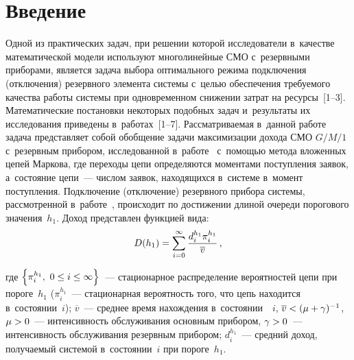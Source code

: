   



\thispagestyle{headings}

\begin{multicols}{2}

\label{st\stat}
  
\section{Введение}
  
  Одной из практических задач, при решении которой исследователи 
в~качестве математической модели используют многолинейные СМО с~резервными приборами, является задача выбора 
оптимального режима подключения (отключения) резервного элемента 
системы с~целью обеспечения требуемого качества работы системы при 
одновременном снижении затрат на ресурсы~[1--3]. Математические 
постановки некоторых подобных задач и~результаты их исследования 
приведены в~работах~[1--7]. Рассматриваемая в~данной работе задача 
представляет собой обобщение задачи максимизации дохода СМО $G/M/1$ 
с~резервным прибором, исследованной в~работе~\cite{7-al} с~по\-мощью метода 
вложенных цепей Маркова, где переходы цепи определяются моментами 
поступления заявок, а~со\-сто\-яние цепи~--- чис\-лом заявок, находящихся  
в~сис\-те\-ме в~момент поступления. Подключение (отключение) резервного 
прибора системы, рас\-смот\-рен\-ной в~работе~\cite{7-al}, происходит по 
достижении длиной очереди порогового значения~$h_1$. 
Доход представлен 
функцией вида:
  \begin{equation}
  D(h_1)= \sum\limits^\infty_{i=0} \displaystyle\frac{\displaystyle d_i^{h_1} \pi_i^{h_1}\mathstrut}{\displaystyle \overline{v}\mathstrut}\,,
  \label{e1-al}
  \end{equation}
  
\columnbreak
  
  \noindent
где $\left\{ \pi_i^{h_1},\ 0\hm \leq i\hm\leq \infty\right\}$~--- стационарное 
распределение вероятностей цепи при пороге~$h_1$ ($\pi_i^{h_1}$~--- 
стационарная вероятность того, что цепь находится в~со\-сто\-янии~$i$); 
$\overline{v}$~--- среднее время нахождения в~со\-сто\-янии~~$i$, 
$\overline{v}\hm < (\mu\hm+ \gamma)^{-1}$, $\mu\hm>0$~--- ин\-тен\-сив\-ность 
обслуживания основным прибором, $\gamma\hm>0$~--- ин\-тен\-сив\-ность 
обслуживания резервным прибором; $d_i^{h_1}$~--- средний доход, 
получаемый системой в~со\-сто\-янии~$i$ при пороге~$h_1$.


\end{multicols}
